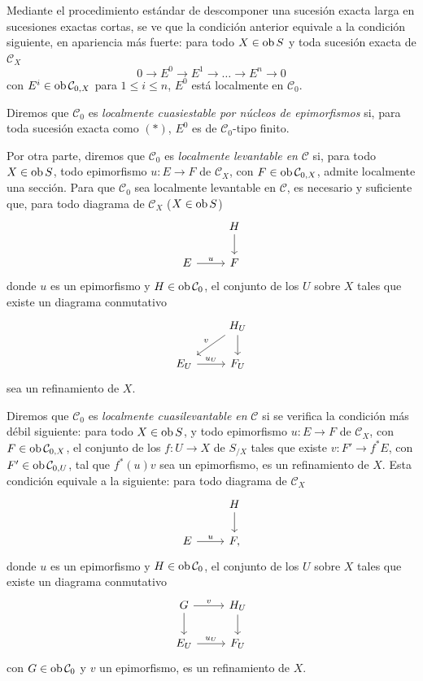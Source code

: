 Mediante el procedimiento estándar de descomponer una sucesión exacta larga en sucesiones exactas cortas, se ve que la condición anterior equivale a la condición siguiente, en apariencia más fuerte: para todo \(X\in\operatorname{ob} S\) y toda sucesión exacta de \(\mathcal C_X\)
\begin{equation}\tag{*}
  0\longrightarrow E^0\longrightarrow E^1\longrightarrow\ldots\longrightarrow E^n\longrightarrow 0
\end{equation}
con \(E^i\in\operatorname{ob}\mathcal C_{0,X}\) para \(1\leq i\leq n\), \(E^0\) está localmente en \(\mathcal C_0\).

Diremos que \(\mathcal C_0\) es \emph{localmente cuasiestable por núcleos de epimorfismos} si, para toda sucesión exacta como \((*)\), \(E^0\) es de \(\mathcal C_0\)-tipo finito.

Por otra parte, diremos que \(\mathcal C_0\) es \emph{localmente levantable en} \(\mathcal C\) si, para todo \(X\in\operatorname{ob} S\), todo epimorfismo \(u:E\longrightarrow F\) de \(\mathcal C_X\), con \(F\in\operatorname{ob}\mathcal C_{0,X}\), admite localmente una sección. Para que \(\mathcal C_0\) sea localmente levantable en \(\mathcal C\), es necesario y suficiente que, para todo diagrama de \(\mathcal C_X\) (\(X\in\operatorname{ob} S\))
\[
\begin{tikzcd}
& H \arrow[d]\\
E \arrow[r,"u"] & F
\end{tikzcd}
\]
donde \(u\) es un epimorfismo y \(H\in\operatorname{ob}\mathcal C_0\), el conjunto de los \(U\) sobre \(X\) tales que existe un diagrama conmutativo
\[
\begin{tikzcd}
& H_U \arrow[d] \arrow[dl,"\sisi{u}{v}"']\\
E_U \arrow[r,"\sisi{U}{u_U}"] & F_U
\end{tikzcd}
\]
sea un refinamiento de \(X\).

Diremos que \(\mathcal C_0\) es \emph{localmente cuasilevantable en} \(\mathcal C\) si se verifica la condición más débil siguiente: para todo \(X\in\operatorname{ob} S\), y todo epimorfismo \(u:E\longrightarrow F\) de \(\mathcal C_X\), con \(F\in\operatorname{ob}\mathcal C_{0,X}\), el conjunto de los \(f:U\to X\) de \(S_{/X}\) tales que existe \(v:F'\longrightarrow f^*E\), con \(F'\in\operatorname{ob}\mathcal C_{0,U}\), tal que \(f^*(u)v\) sea un epimorfismo, es un refinamiento de \(X\). Esta condición equivale a la siguiente: para todo diagrama de \(\mathcal C_X\)
\[
\begin{tikzcd}
& H \arrow[d]\\
E \arrow[r,"u"] & F ,
\end{tikzcd}
\]
donde \(u\) es un epimorfismo y \(H\in\operatorname{ob}\mathcal C_0\), el conjunto de los \(U\) sobre \(X\) tales que existe un diagrama conmutativo
\[
\begin{tikzcd}
G \arrow[r,"v"] \arrow[d] & H_U \arrow[d]\\
E_U \arrow[r,"u_U"] & F_U
\end{tikzcd}
\]
con \(G\in\operatorname{ob}\mathcal C_0\) y \(v\) un epimorfismo, es un refinamiento de \(X\).


